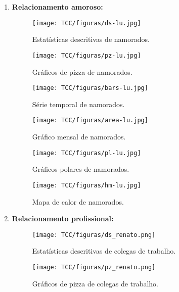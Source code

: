 \begin{enumerate}
  \item \textbf{Relacionamento amoroso:}
    \begin{figure}[H]
        \centering
        \texttt{[image: TCC/figuras/ds-lu.jpg]}
        \caption{Estatísticas descritivas de namorados.}
        \label{ds-namorados}
    \end{figure}
    
    \begin{figure}[H]
        \centering
        \texttt{[image: TCC/figuras/pz-lu.jpg]}
        \caption{Gráficos de pizza de namorados.}
        \label{pz-namorados}
    \end{figure}
    
    \begin{figure}[H]
        \centering
        \texttt{[image: TCC/figuras/bars-lu.jpg]}
        \caption{Série temporal de namorados.}
        \label{bars-namorados}
    \end{figure}
    
    \begin{figure}[H]
        \centering
        \texttt{[image: TCC/figuras/area-lu.jpg]}
        \caption{Gráfico mensal de namorados.}
        \label{area-namorados}
    \end{figure}
    
    \begin{figure}[H]
        \centering
        \texttt{[image: TCC/figuras/pl-lu.jpg]}
        \caption{Gráficos polares de namorados.}
        \label{pl-namorados}
    \end{figure}
    
    \begin{figure}[H]
        \centering
        \texttt{[image: TCC/figuras/hm-lu.jpg]}
        \caption{Mapa de calor de namorados.}
        \label{hm-namorados}
    \end{figure}
  
  \item \textbf{Relacionamento profissional:}
    \begin{figure}[H]
        \centering
        \texttt{[image: TCC/figuras/ds\_renato.png]}
        \caption{Estatísticas descritivas de colegas de trabalho.}
        \label{ds-trabalho}
    \end{figure}
    
    \begin{figure}[H]
        \centering
        \texttt{[image: TCC/figuras/pz\_renato.png]}
        \caption{Gráficos de pizza de colegas de trabalho.}
        \label{pz-trabalho}
    \end{figure}
    

\end{enumerate}
